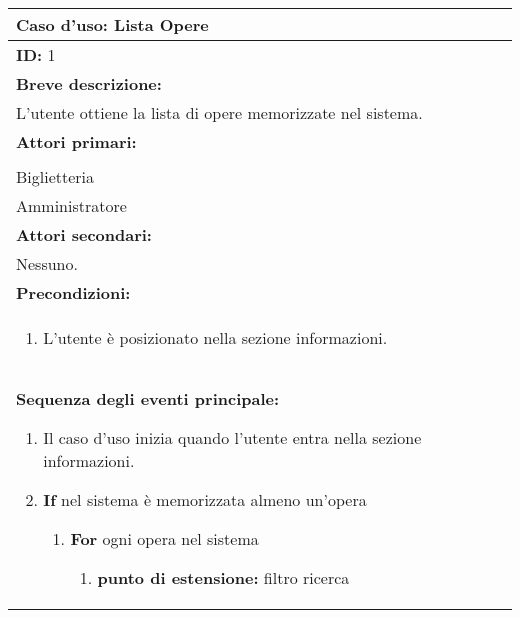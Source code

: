 \begin{table}[H]
    \begin{tabular}{|p{\linewidth}|}
        \hline
        \cellcolor{gray!100}
        \color{white}
        \centerline{\textbf{Caso d'uso:} Lista Opere} \\
        \hline
        \textbf{ID:} 1 \\
        \hline
        \cellcolor{gray!20}
        \textbf{Breve descrizione:} \\
        \cellcolor{gray!20}
        L'utente ottiene la lista di opere memorizzate nel sistema. \\
        \hline
        \textbf{Attori primari:} \\
        \begin{minipage}{\linewidth}
            Cliente \\
            Biglietteria \\
            Amministratore
        \end{minipage}
        \vspace{0pt} \\  %
        \hline
        \textbf{Attori secondari:} \\
        Nessuno. \\
        \hline
        \cellcolor{gray!20}
        \textbf{Precondizioni:} \\
        \cellcolor{gray!20}
        \begin{minipage}{\linewidth}
            \begin{enumerate}
                \item L'utente è posizionato nella sezione informazioni.
            \end{enumerate}
        \end{minipage} \\
        \hline
        \textbf{Sequenza degli eventi principale:}
        \begin{enumerate}
            \item Il caso d'uso inizia quando l'utente entra nella sezione informazioni.
            \item \textbf{If} nel sistema è memorizzata almeno un'opera
            \begin{enumerate}
                \item \textbf{For} ogni opera nel sistema
                \begin{enumerate}
                    \item[] \textbf{punto di estensione:} filtro ricerca

\end{enumerate}
\end{enumerate}
\end{enumerate}
\end{tabular}
\end{table}
